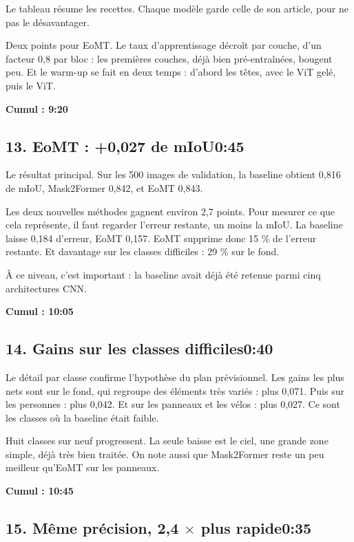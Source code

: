 \documentclass[11pt,a4paper]{article}
\newcommand{\cumul}[1]{\par{\hfill\small\color{accent}\bfseries #1}\par}
\newcommand{\tempo}[1]{\hfill{\normalsize\color{accent}#1}}
\begin{document}
Le tableau résume les recettes. Chaque modèle garde celle de son article, pour ne pas le désavantager.

Deux points pour EoMT. Le taux d'apprentissage décroît par couche, d'un facteur 0,8 par bloc : les premières couches, déjà bien pré-entraînées, bougent peu. Et le warm-up se fait en deux temps : d'abord les têtes, avec le ViT gelé, puis le ViT.

\cumul{Cumul : 9:20}

\subsection*{13. EoMT : +0,027 de mIoU\tempo{0:45}}

Le résultat principal. Sur les 500 images de validation, la baseline obtient 0,816 de mIoU, Mask2Former 0,842, et EoMT 0,843.

Les deux nouvelles méthodes gagnent environ 2,7 points. Pour mesurer ce que cela représente, il faut regarder l'erreur restante, un moins la mIoU. La baseline laisse 0,184 d'erreur, EoMT 0,157. EoMT supprime donc 15 \% de l'erreur restante. Et davantage sur les classes difficiles : 29 \% sur le fond.

À ce niveau, c'est important : la baseline avait déjà été retenue parmi cinq architectures CNN.

\cumul{Cumul : 10:05}

\subsection*{14. Gains sur les classes difficiles\tempo{0:40}}

Le détail par classe confirme l'hypothèse du plan prévisionnel. Les gains les plus nets sont sur le fond, qui regroupe des éléments très variés : plus 0,071. Puis sur les personnes : plus 0,042. Et sur les panneaux et les vélos : plus 0,027. Ce sont les classes où la baseline était faible.

Huit classes sur neuf progressent. La seule baisse est le ciel, une grande zone simple, déjà très bien traitée. On note aussi que Mask2Former reste un peu meilleur qu'EoMT sur les panneaux.

\cumul{Cumul : 10:45}

\subsection*{15. Même précision, 2,4 $\times$ plus rapide\tempo{0:35}}
\end{document}
